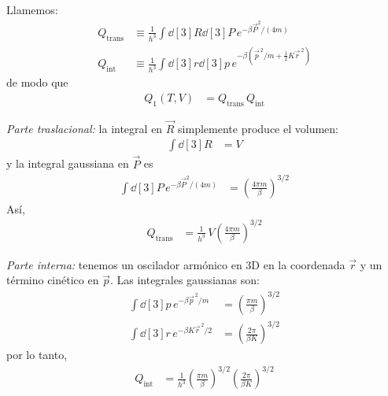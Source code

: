 \documentclass{article}
\begin{document}
Llamemos:
\begin{equation}
\begin{split}
Q_{\text{trans}}
&\equiv \frac{1}{h^{3}}
\int \dd[3]{R}\dd[3]{P}\,
e^{-\beta \vec P^{2}/(4m)} \\[4pt]
Q_{\text{int}}
&\equiv \frac{1}{h^{3}}
\int \dd[3]{r}\dd[3]{p}\,
e^{-\beta\left(\vec p^{\,2}/m + \frac{1}{2}K\vec r^{\,2}\right)}
\end{split}\label{eq:Qtrans_Qint_def}
\end{equation}
de modo que
\begin{equation}
\begin{split}
Q_{1}(T,V)
&= Q_{\text{trans}}\,Q_{\text{int}}
\end{split}\label{eq:Q1_Qtrans_Qint}
\end{equation}

\emph{Parte traslacional:} la integral en \(\vec R\) simplemente produce el volumen:
\begin{equation}
\begin{split}
\int \dd[3]{R} &= V
\end{split}\label{eq:int_R}
\end{equation}
y la integral gaussiana en \(\vec P\) es
\begin{equation}
\begin{split}
\int \dd[3]{P}\,e^{-\beta \vec P^{2}/(4m)}
&= \left(\frac{4\pi m}{\beta}\right)^{3/2}
\end{split}\label{eq:int_P}
\end{equation}
Así,
\begin{equation}
\begin{split}
Q_{\text{trans}}
&= \frac{1}{h^{3}}\,V\left(\frac{4\pi m}{\beta}\right)^{3/2}
\end{split}\label{eq:Qtrans_final}
\end{equation}

\emph{Parte interna:} tenemos un oscilador armónico en 3D en la coordenada \(\vec r\)
y un término cinético en \(\vec p\). Las integrales gaussianas son:
\begin{equation}
\begin{split}
\int \dd[3]{p}\,e^{-\beta \vec p^{\,2}/m}
&= \left(\frac{\pi m}{\beta}\right)^{3/2} \\[4pt]
\int \dd[3]{r}\,e^{-\beta K\vec r^{\,2}/2}
&= \left(\frac{2\pi}{\beta K}\right)^{3/2}
\end{split}\label{eq:int_p_r}
\end{equation}
por lo tanto,
\begin{equation}
\begin{split}
Q_{\text{int}}
&= \frac{1}{h^{3}}
\left(\frac{\pi m}{\beta}\right)^{3/2}
\left(\frac{2\pi}{\beta K}\right)^{3/2}
\end{split}\label{eq:Qint_final}
\end{equation}
\end{document}
